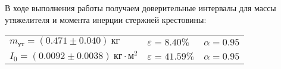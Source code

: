 В ходе выполнения работы получаем доверительные интервалы для массы утяжелителя и момента инерции стержней крестовины:

\begin{tabular}{lll}
    $m_{\text{ут}} = (0.471 \pm 0.040) \ \text{кг}$ & $\varepsilon = 8.40\%$ & $\alpha = 0.95$ \\

    $I_0 = (0.0092 \pm 0.0038) \ \text{кг} \cdot \text{м}^2$ & $\varepsilon = 41.59\%$ & $\alpha = 0.95$ \\
\end{tabular}